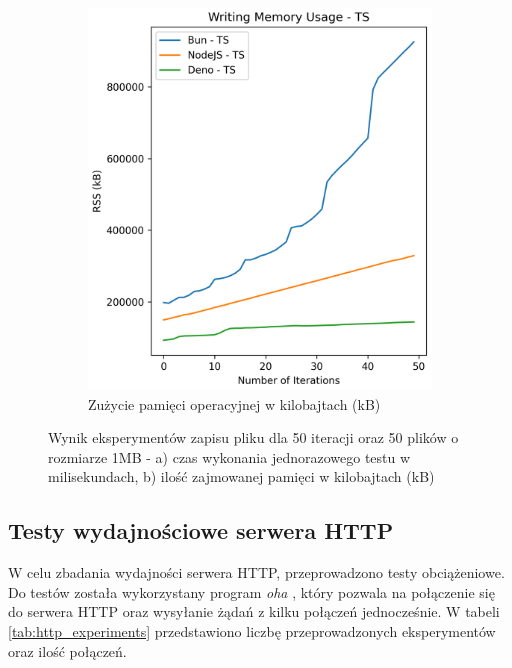 \begin{figure}[H]
\begin{subfigure}[b]{0.42\textwidth}
  \end{subfigure}
  \begin{subfigure}[b]{0.42\textwidth}
    \centering
    \includegraphics[width=\textwidth]{Figures/files/files_writing_50_2000_50_ts_memory.png}
    \caption{Zużycie pamięci operacyjnej w kilobajtach (kB)}
    \label{fig:file_e2_writing_ts_memory}
  \end{subfigure}
  \caption{Wynik eksperymentów zapisu pliku dla 50 iteracji oraz 50 plików o rozmiarze 1MB - a) czas wykonania jednorazowego testu w milisekundach, b) ilość zajmowanej pamięci w kilobajtach (kB)}
  \label{fig:file_e2_writing_ts}
\end{figure}

\subsection{Testy wydajnościowe serwera HTTP}
W celu zbadania wydajności serwera HTTP, przeprowadzono testy obciążeniowe. Do testów została wykorzystany program \textit{oha} \cite{oha}, który pozwala na połączenie się do serwera HTTP oraz wysyłanie żądań z kilku połączeń jednocześnie. W tabeli \ref{tab:http_experiments} przedstawiono liczbę przeprowadzonych eksperymentów oraz ilość połączeń.

